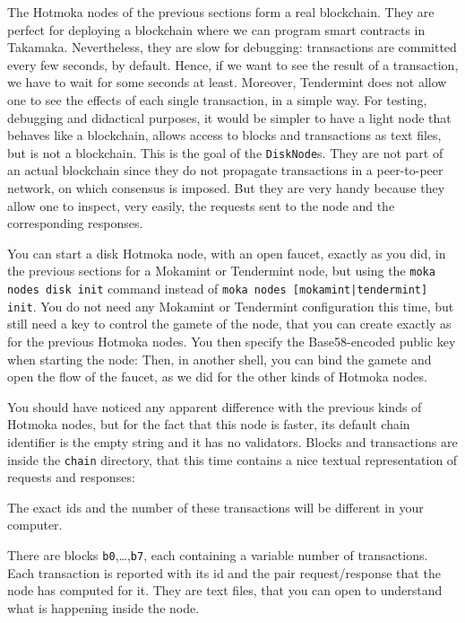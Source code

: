 The Hotmoka nodes of the previous sections form a real blockchain.
They are perfect for deploying a blockchain where we can program smart contracts in
Takamaka. Nevertheless, they are slow for debugging: transactions are committed every few seconds,
by default. Hence, if we want to see the result of a transaction,
we have to wait for some seconds at least.
Moreover, Tendermint does not allow one to see the effects of each single transaction,
in a simple way. For testing, debugging and didactical purposes, it would be simpler to have a light node
that behaves like a blockchain, allows access to blocks and transactions as text files,
but is not a blockchain. This is the goal of the \texttt{DiskNode}s.
They are not part of an actual blockchain since they do not propagate transactions
in a peer-to-peer network, on which consensus is imposed. But they are very
handy because they allow one to inspect, very easily, the requests sent to
the node and the corresponding responses.

You can start a disk Hotmoka node, with an open faucet, exactly as you did,
in the previous sections for a Mokamint or Tendermint node, but using the \texttt{moka nodes disk init}
command instead of \texttt{moka nodes [mokamint|tendermint] init}. You do not need any Mokamint or Tendermint configuration
this time, but still need a key to control the gamete of the node, that you can create
exactly as for the previous Hotmoka nodes.
You then specify the Base58-encoded public key when starting the node:
%
%
Then, in another shell, you can bind the gamete and open the flow of the faucet, as we did
for the other kinds of Hotmoka nodes.

You should have noticed any apparent difference with the previous kinds of Hotmoka nodes,
but for the fact that this node is faster,
its default chain identifier is the empty string and it has no validators. Blocks and transactions are
inside the \texttt{chain} directory, that this time contains a nice textual representation of requests and
responses:
%

\begin{commentbox}
The exact ids and the number of these transactions will be different in your computer.
\end{commentbox}

There are blocks \texttt{b0},\ldots,\texttt{b7}, each containing a variable number of transactions.
Each transaction is reported with its id and the pair request/response that the node has computed
for it. They are text files, that you can open to understand what is happening inside the node.

